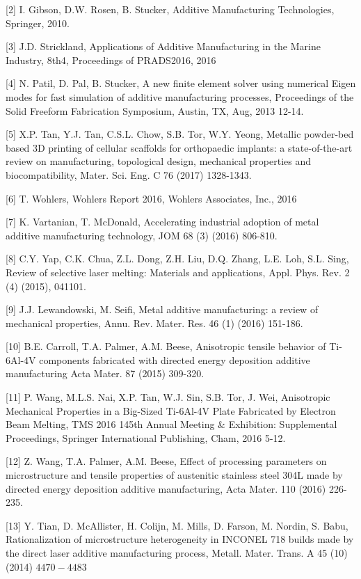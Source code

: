 \documentclass[10pt]{article}
\begin{document}
[2] I. Gibson, D.W. Rosen, B. Stucker, Additive Manufacturing Technologies, Springer, 2010.

[3] J.D. Strickland, Applications of Additive Manufacturing in the Marine Industry, 8th4, Proceedings of PRADS2016, 2016

[4] N. Patil, D. Pal, B. Stucker, A new finite element solver using numerical Eigen modes for fast simulation of additive manufacturing processes, Proceedings of the Solid Freeform Fabrication Symposium, Austin, TX, Aug, 2013 12-14.

[5] X.P. Tan, Y.J. Tan, C.S.L. Chow, S.B. Tor, W.Y. Yeong, Metallic powder-bed based 3D printing of cellular scaffolds for orthopaedic implants: a state-of-the-art review on manufacturing, topological design, mechanical properties and biocompatibility, Mater. Sci. Eng. C 76 (2017) 1328-1343.

[6] T. Wohlers, Wohlers Report 2016, Wohlers Associates, Inc., 2016

[7] K. Vartanian, T. McDonald, Accelerating industrial adoption of metal additive manufacturing technology, JOM 68 (3) (2016) 806-810.

[8] C.Y. Yap, C.K. Chua, Z.L. Dong, Z.H. Liu, D.Q. Zhang, L.E. Loh, S.L. Sing, Review of selective laser melting: Materials and applications, Appl. Phys. Rev. 2 (4) (2015), 041101.

[9] J.J. Lewandowski, M. Seifi, Metal additive manufacturing: a review of mechanical properties, Annu. Rev. Mater. Res. 46 (1) (2016) 151-186.

[10] B.E. Carroll, T.A. Palmer, A.M. Beese, Anisotropic tensile behavior of Ti-6Al-4V components fabricated with directed energy deposition additive manufacturing Acta Mater. 87 (2015) 309-320.

[11] P. Wang, M.L.S. Nai, X.P. Tan, W.J. Sin, S.B. Tor, J. Wei, Anisotropic Mechanical Properties in a Big-Sized Ti-6Al-4V Plate Fabricated by Electron Beam Melting, TMS 2016 145th Annual Meeting \& Exhibition: Supplemental Proceedings, Springer International Publishing, Cham, 2016 5-12.

[12] Z. Wang, T.A. Palmer, A.M. Beese, Effect of processing parameters on microstructure and tensile properties of austenitic stainless steel 304L made by directed energy deposition additive manufacturing, Acta Mater. 110 (2016) 226-235.

[13] Y. Tian, D. McAllister, H. Colijn, M. Mills, D. Farson, M. Nordin, S. Babu, Rationalization of microstructure heterogeneity in INCONEL 718 builds made by the direct laser additive manufacturing process, Metall. Mater. Trans. A 45 (10) (2014) $4470-4483$
\end{document}
